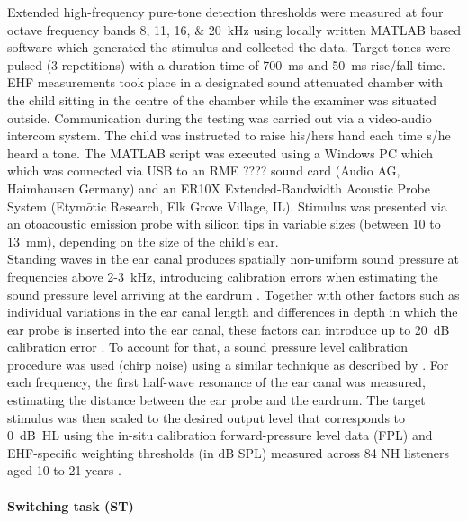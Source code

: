\documentclass[a4paper, twoside]{templates/ociamthesis}
\begin{document}
Extended high-frequency pure-tone detection thresholds were measured at four octave frequency bands 8, 11, 16, \& 20~kHz using locally written MATLAB based software which generated the stimulus and collected the data. Target tones were pulsed (3 repetitions) with a duration time of 700~ms and 50~ms rise/fall time. EHF measurements took place in a designated sound attenuated chamber with the child sitting in the centre of the chamber while the examiner was situated outside. Communication during the testing was carried out via a video-audio intercom system. The child was instructed to raise his/hers hand each time s/he heard a tone. The MATLAB script was executed using a Windows PC which which was connected via USB to an RME ???? sound card (Audio AG, Haimhausen Germany) and an ER10X Extended-Bandwidth Acoustic Probe System (Etym\(\bar{o}\)tic Research, Elk Grove Village, IL). Stimulus was presented via an otoacoustic emission probe with silicon tips in variable sizes (between 10 to 13~mm), depending on the size of the child's ear.\\

Standing waves in the ear canal produces spatially non-uniform sound pressure at frequencies above 2-3~kHz, introducing calibration errors when estimating the sound pressure level arriving at the eardrum \autocite{Siegel1994,Richmond2011,Lee2012}. Together with other factors such as individual variations in the ear canal length and differences in depth in which the ear probe is inserted into the ear canal, these factors can introduce up to 20~dB calibration error \autocite{Siegel1994}. To account for that, a sound pressure level calibration procedure was used (chirp noise) using a similar technique as described by \textcite{Lee2012}. For each frequency, the first half-wave resonance of the ear canal was measured, estimating the distance between the ear probe and the eardrum. The target stimulus was then scaled to the desired output level that corresponds to 0~dB~HL using the in-situ calibration forward-pressure level data (FPL) and EHF-specific weighting thresholds (in dB SPL) measured across 84 NH listeners aged 10 to 21 years \autocite[see Table 1 in][]{Lee2012}.

\hypertarget{switching-task-st}{%
\paragraph{Switching task (ST)}\label{switching-task-st}}
\end{document}
